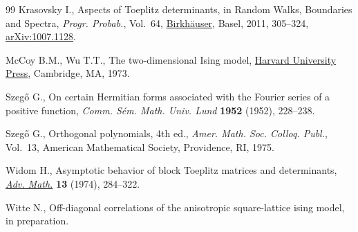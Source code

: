 \begin{thebibliography}{99}
Krasovsky I., Aspects of {T}oeplitz determinants, in Random {W}alks,
 {B}oundaries and {S}pectra, \textit{Progr. Probab.}, Vol.~64,
 \href{https://doi.org/10.1007/978-3-0346-0244-0_16}{Birkh\"auser}, Basel, 2011, 305--324,
 \href{https://arxiv.org/abs/1007.1128}{arXiv:1007.1128}.

McCoy B.M., Wu T.T., The two-dimensional {I}sing model, \href{https://doi.org/10.4159/harvard.9780674180758}{Harvard University
 Press}, Cambridge, MA, 1973.

Szeg\H{o} G., On certain {H}ermitian forms associated with the {F}ourier series
 of a positive function, \textit{Comm. S\'em. Math. Univ. Lund} \textbf{1952} (1952), 228--238.

Szeg\H{o} G., Orthogonal polynomials, 4th ed., \textit{Amer. Math. Soc. Colloq.
 Publ.}, Vol.~13, American Mathematical Society, Providence, RI,
 1975.

Widom H., Asymptotic behavior of block {T}oeplitz matrices and determinants,
 \href{https://doi.org/10.1016/0001-8708(74)90072-3}{\textit{Adv. Math.}} \textbf{13} (1974), 284--322.

Witte N., Off-diagonal correlations of the anisotropic square-lattice ising
 model, in preparation.

\end{thebibliography}
